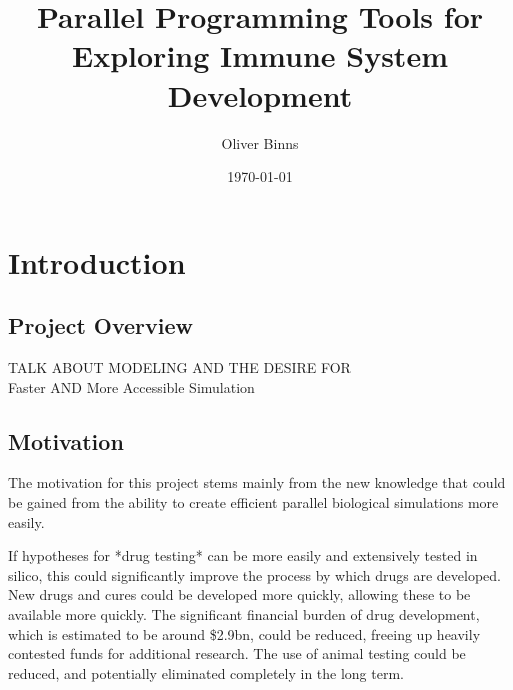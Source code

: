 \documentclass{UoYCSproject}
\title{Parallel Programming Tools for Exploring Immune System Development}
\author{Oliver Binns}
\date{\today}
\begin{document}
\maketitle
\listoffigures
\listoftables
\renewcommand*{\lstlistlistingname}{List of Listings}
\lstlistoflistings

\chapter{Introduction}
\section{Project Overview}
TALK ABOUT MODELING AND THE DESIRE FOR 
\\
Faster AND More Accessible Simulation

\section{Motivation}
The motivation for this project stems mainly from the new knowledge that could be gained from the ability to create efficient parallel biological simulations more easily.

If hypotheses for *drug testing* can be more easily and extensively tested in silico, this could significantly improve the process by which drugs are developed.
New drugs and cures could be developed more quickly, allowing these to be available more quickly.
The significant financial burden of drug development, which is estimated to be around \$2.9bn\cite{drug_cost}, could be reduced, freeing up heavily contested funds for additional research.
The use of animal testing could be reduced, and potentially eliminated completely in the long term.

\end{document}
